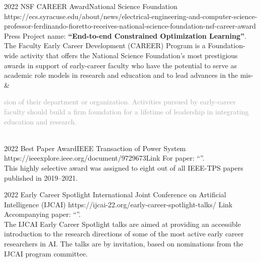 \begin{awards}
	\awardentryD
	{2022}
	{NSF CAREER Award}{National Science Foundation}
	{https://ecs.syracuse.edu/about/news/electrical-engineering-and-computer-science-professor-ferdinando-fioretto-receives-national-science-foundation-nsf-career-award}
	{Press}
	{Project name: \textbf{``End-to-end Constrained Optimization Learning''}.\\ 
	The Faculty Early Career Development (CAREER) Program is a Foundation-wide 
	activity that offers the National Science Foundation's most prestigious awards in support of early-career faculty who have the potential to serve as academic role models in research and education and to lead advances in the mis-
	}
	& \hspace{10pt}\begin{minipage}[t]{14.4cm}
	 \textcolor{darkGrey}{sion of their department or organization. Activities pursued by early-career faculty should build a firm foundation for a lifetime of leadership in integrating education and research.}\vspace{0.3em}
       \end{minipage}\\%

	\awardentryD
	{2022}
	{Best Paper Award}{IEEE Transaction of Power System}
	{https://ieeexplore.ieee.org/document/9729673}{Link}
	{
	For paper: ``''.\\
	This highly selective award was assigned to eight out of all IEEE-TPS papers published in 2019--2021.}

	\awardentryD
	{2022}
	{Early Career Spotlight}%
	{International Joint Conference on Artificial Intelligence (IJCAI)}
	{https://ijcai-22.org/early-career-spotlight-talks/}
	{Link}
	{Accompanying paper: ``''.\\
	The IJCAI Early Career Spotlight talks are aimed at providing an accessible introduction to the research directions of some of the most active early career researchers in AI.
	The talks are by invitation, based on nominations from the IJCAI program committee.
	}


\end{awards}
